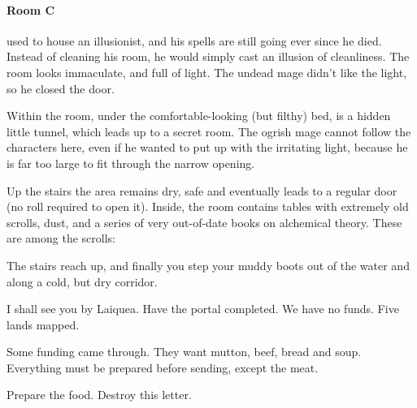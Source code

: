 \begin{multicols}{2}
\paragraph{Room C} used to house an illusionist, and his spells are still going ever since he died.  Instead of cleaning his room, he would simply cast an illusion of cleanliness.  The room looks immaculate, and full of light.  The undead mage didn't like the light, so he closed the door.

Within the room, under the comfortable-looking (but filthy) bed, is a hidden little tunnel, which leads up to a secret room.
The ogrish mage cannot follow the characters here, even if he wanted to put up with the irritating light, because he is far too large to fit through the narrow opening.

\begin{figure*}[t]



\end{figure*}


Up the stairs the area remains dry, safe and eventually leads to a regular door (no roll required to open it).  Inside, the room contains tables with extremely old scrolls, dust, and a series of very out-of-date books on alchemical theory.  These are among the scrolls:

\begin{boxtext}

	The stairs reach up, and finally you step your muddy boots out of the water and along a cold, but dry corridor.

\end{boxtext}

\begin{exampletext}

	I shall see you by Laiquea.  Have the portal completed.  We have no funds.  Five lands mapped.

\end{exampletext}

\begin{exampletext}

	Some funding came through.  They want mutton, beef, bread and soup.  Everything must be prepared before sending, except the meat.

	Prepare the food.  Destroy this letter.

\end{exampletext}


\end{multicols}
